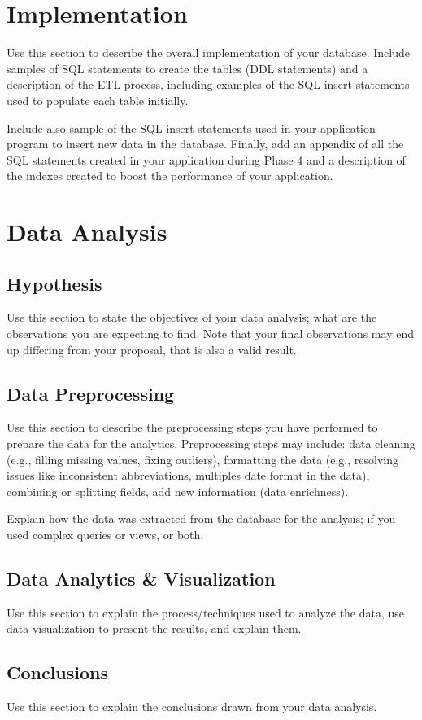 \documentclass[12pt]{article}
\begin{document}
\section{Implementation}
Use this section to describe the overall implementation of your database. Include samples of SQL statements to create the tables (DDL statements) and a description of the ETL process, including examples of the SQL insert statements used to populate each table initially.

Include also sample of the SQL insert statements used in your application program to insert new data in the database. Finally, add an appendix of all the SQL statements created in your application during Phase 4 and a description of the indexes created to boost the performance of your application.
\section{Data Analysis}
\subsection{Hypothesis}
Use this section to state the objectives of your data analysis; what are the observations you are expecting to find. Note that your final
observations may end up differing from your proposal, that is also a valid result.
\subsection{Data Preprocessing}
Use this section to describe the preprocessing steps you have performed to prepare the data for the analytics. Preprocessing steps may include: data cleaning (e.g., filling missing values, fixing outliers), formatting the data (e.g., resolving issues like inconsistent abbreviations, multiples date format in the data), combining or splitting fields, add new information (data enrichness).

Explain how the data was extracted from the database for the analysis; if you used complex queries or views, or both.
\subsection{Data Analytics \& Visualization}
Use this section to explain the process/techniques used to analyze the data, use data visualization to present the results, and explain them.
\subsection{Conclusions}
Use this section to explain the conclusions drawn from your data analysis.\\
\end{document}
